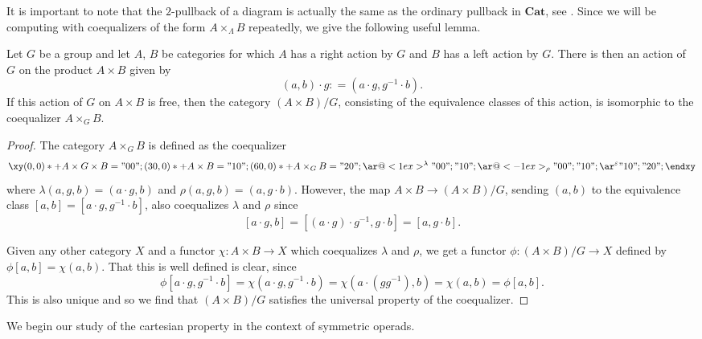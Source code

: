\documentclass{amsbook} %
\newcommand{\mb}{\mathbf}
\numberwithin{section}{chapter}
\begin{document}
It is important to note that the  $2$-pullback of a diagram is actually the same as the ordinary pullback in $\mb{Cat}$, see \cite{kelly-elem}. Since we will be computing with coequalizers of the form $A \times_{\Lambda} B$ repeatedly, we give the following useful lemma.

\begin{lem}\label{coeq-lem}
Let $G$ be a group and let $A$, $B$ be categories for which $A$ has a right action by $G$ and $B$ has a left action by $G$. There is then an action of $G$ on the product $A \times B$ given by
    \[
        (a,b) \cdot g \colon = \left(a \cdot g, g^{-1} \cdot b\right).
    \]
If this action of $G$ on $A \times B$ is free, then the category $(A \times B)/G$, consisting of the equivalence classes of this action, is isomorphic to the coequalizer $A \times_G B$.
\end{lem}
\begin{proof}
The category $A \times_G B$ is defined as the coequalizer
    \[
        \xy
            (0,0)*+{A \times G \times B}="00";
            (30,0)*+{A \times B}="10";
            (60,0)*+{A \times_G B}="20";
            {\ar@<1ex>^{\lambda} "00" ; "10"};
            {\ar@<-1ex>_{\rho} "00" ; "10"};
            {\ar^{\varepsilon} "10" ; "20"};
        \endxy
    \]
where $\lambda(a,g,b) = (a \cdot g, b)$ and $\rho(a,g,b) = (a, g \cdot b)$. However, the map $A \times B \rightarrow (A \times B)/G$, sending $(a,b)$ to the equivalence class $[a,b] = [a \cdot g, g^{-1} \cdot b]$, also coequalizes $\lambda$ and $\rho$ since
    \[
        [a \cdot g, b] = \left[(a \cdot g) \cdot g^{-1}, g \cdot b\right] = [a, g \cdot b].
    \]

Given any other category $X$ and a functor $\chi \colon A \times B \rightarrow X$ which coequalizes $\lambda$ and $\rho$, we get a functor $\phi \colon (A \times B)/G \rightarrow X$ defined by $\phi[a,b] = \chi(a,b)$. That this is well defined is clear, since
    \[
        \phi\left[a \cdot g, g^{-1} \cdot b\right] = \chi\left(a \cdot g, g^{-1} \cdot b\right) = \chi\left(a \cdot \left(gg^{-1}\right), b\right) = \chi(a, b) = \phi[a,b].
    \]
This is also unique and so we find that $(A \times B)/G$ satisfies the universal property of the coequalizer.
\end{proof}

We begin our study of the cartesian property in the context of symmetric operads.
\end{document}
